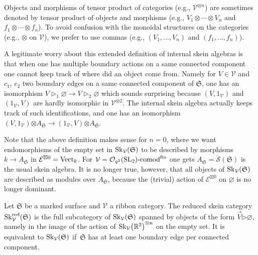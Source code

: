 \documentclass[pdftex]{sigma}%
\numberwithin{equation}{section}
\newcommand{\bmrhd}{\bm{\triangleright}}
\newcommand{\bmotimes}{\bm{\otimes}}
\newcommand{\Oqcomfin}{\Oq\text{-}{\rm comod}^{\rm fin}}
\newcommand{\Oq}{\mathcal{O}_{q^2}({\rm SL}_2)}
\begin{document}
\begin{Remark}
Objects and morphisms of tensor product of categories (e.g., $\mathcal{V}^{\otimes n}$) are sometimes denoted by tensor product of objects and morphisms (e.g., $V_1 \otimes \cdots \otimes V_n$ and $f_1 \otimes \cdots \otimes f_n$). To avoid confusion with the monoidal structures on the categories (e.g., $\otimes$ on $\mathcal{V}$), we prefer to use commas (e.g., $(V_1,\dots,V_n)$ and $(f_1,\dots,f_n)$).
\end{Remark}

\begin{Remark}
A legitimate worry about this extended definition of internal skein algebras is that when one has multiple boundary actions on a same connected component one cannot keep track of where did an object come from. Namely for $V \in \mathcal{V}$ and $c_1$, $c_2$ two boundary edges on a same connected component of $\mathfrak{S}$, one has an isomorphism $V\rhd_1\varnothing \to V\rhd_2\varnothing$ which sounds surprising because $(V,1_\mathcal{V})$ and $(1_\mathcal{V},V)$ are hardly isomorphic in $\mathcal{V}^{\otimes 2}$. The internal skein algebra actually keeps track of such identifications, and one has an isomorphism $(V,1_\mathcal{V})\bmotimes A_\mathfrak{S} \to(1_\mathcal{V},V)\bmotimes A_\mathfrak{S}$.
\end{Remark}

Note that the above definition makes sense for $n=0$, where we want endomorphisms of the empty set in ${\rm Sk}_\mathcal{V}(\mathfrak{S})$ to be described by morphisms $k\to A_\mathfrak{S}$ in $\mathcal{E}^{\boxtimes 0} = {\rm Vect}_k$. For $\mathcal{V}=\Oqcomfin$ one gets $A_\mathfrak{S} = \mathring{\mathscr{S}}(\mathfrak{S})$ is the usual skein algebra. It is no longer true, however, that all objects of ${\rm Sk}_\mathcal{V}(\mathfrak{S})$ are described as modules over $A_\mathfrak{S}$, because the (trivial) action of $\mathcal{E}^{\boxtimes 0}$ on $\varnothing$ is no longer dominant.

\begin{Definition}
Let $\mathfrak{S}$ be a marked surface and $\mathcal{V}$ a ribbon category. The reduced skein category ${\rm Sk}_\mathcal{V}^{\rm red}(\mathfrak{S})$ is the full subcategory of ${\rm Sk}_\mathcal{V}(\mathfrak{S})$ spanned by objects of the form $\vec{V}\bmrhd \varnothing$, namely in the image of the action of ${\rm Sk}_\mathcal{V}\big(\mathbb{R}^2\big)^{\otimes n}$ on the empty set.
It is equivalent to ${\rm Sk}_\mathcal{V}(\mathfrak{S})$ if~$\mathfrak{S}$ has at least one boundary edge per connected component.
\end{Definition}
\end{document}
